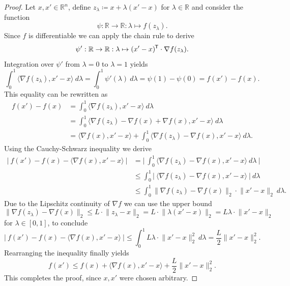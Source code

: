 \documentclass[11pt, a4paper]{article}
\newcommand{\R}{\mathbb{R}}
\newcommand*{\tr}{^{\mkern-1.5mu\mathsf{T}}}
\begin{document}
\begin{proof}
Let $x,x' \in \R^n$, define $z_{\lambda} \coloneq x + \lambda (x' - x)$ for $\lambda \in \R$ and consider the function
\[ \psi : \R \to \R : \lambda \mapsto f(z_{\lambda}). \]
Since $f$ is differentiable we can apply the chain rule to derive
\[ \psi' : \R \to \R : \lambda \mapsto (x'-x)\tr \cdot \nabla f(z_\lambda) . \]
Integration over $\psi'$ from $\lambda = 0$ to $\lambda = 1$ yields
\[ \int_{0}^{1} \big \langle \nabla f(z_{\lambda}), x'-x \big \rangle \ d\lambda = \int_{0}^{1} \psi'(\lambda) \ d \lambda = \psi(1) - \psi(0) = f(x') - f(x). \]
This equality can be rewritten as
\[ \begin{split} 
f(x') - f(x) 
&= \int_{0}^{1}\big \langle \nabla f(z_{\lambda}), x'-x \big \rangle \ d\lambda \\\
&= \int_{0}^{1} \big \langle \nabla f(z_{\lambda}) - \nabla f(x) + \nabla f(x) , x'-x\big \rangle \ d\lambda \\\
&= \big \langle \nabla f(x), x'-x \big \rangle + \int_{0}^{1} \big \langle \nabla f(z_{\lambda}) - \nabla f(x), x'-x \big \rangle \ d\lambda.
\end{split} \]
Using the Cauchy-Schwarz inequality we derive
\[ \begin{split}
\Big | \ f(x') - f(x) - \big \langle \nabla f(x), x'-x \big \rangle \ \Big | 
&= \Big | \ \int_{0}^{1} \big \langle \nabla f(z_{\lambda}) - \nabla f(x), x'-x \big \rangle \ d\lambda \ \Big | \\\
&\leq \int_{0}^{1} \Big | \ \big \langle \nabla f(z_{\lambda}) - \nabla f(x), x'-x \big \rangle \ \Big | \ d\lambda \\\
&\leq \int_{0}^{1} \big \| \nabla f( z_{\lambda}) - \nabla f(x) \big \|_2 \cdot \big \| x'-x \big \|_2 \ d\lambda.
\end{split} \]
Due to the Lipschitz continuity of $\nabla f$ we can use the upper bound 
\[ \big \| \nabla f( z_{\lambda}) - \nabla f(x) \big \|_2 \leq L \cdot \big \| z_{\lambda} - x \big \|_2 = L \cdot \big \| \lambda(x'-x) \big \|_2 = L\lambda \cdot \big \| x'-x \big \|_2 \]
for $\lambda \in [0,1]$, to conclude
\[ \Big | \ f(x') - f(x) - \big \langle \nabla f(x), x'-x \big \rangle \ \Big | \leq \int_{0}^{1} L\lambda \cdot \big \| x'-x \big \|_2^2 \ d\lambda = \frac{L}{2} \big \| x'-x \big \|_2^2. \]
Rearranging the inequality finally yields
\[ f(x') \leq f(x) + \big \langle \nabla f(x) , x' -x \big \rangle + \frac{L}{2} \big \| x' - x \big \|_2^2. \]
This completes the proof, since $x,x'$ were chosen arbitrary.
\end{proof}
\end{document}
